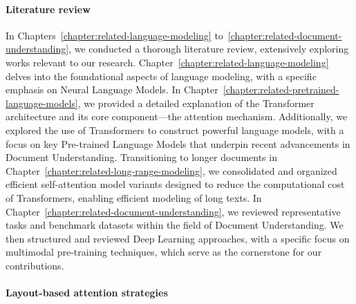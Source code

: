 

\paragraph{Literature review}

In Chapters~\ref{chapter:related-language-modeling} to~\ref{chapter:related-document-understanding}, we conducted a thorough literature review, extensively exploring works relevant to our research. Chapter~\ref{chapter:related-language-modeling} delves into the foundational aspects of language modeling, with a specific emphasis on Neural Language Models. In Chapter~\ref{chapter:related-pretrained-language-models}, we provided a detailed explanation of the Transformer architecture and its core component—the attention mechanism. Additionally, we explored the use of Transformers to construct powerful language models, with a focus on key Pre-trained Language Models that underpin recent advancements in Document Understanding. Transitioning to longer documents in Chapter~\ref{chapter:related-long-range-modeling}, we consolidated and organized efficient self-attention model variants designed to reduce the computational cost of Transformers, enabling efficient modeling of long texts. In Chapter~\ref{chapter:related-document-understanding}, we reviewed representative tasks and benchmark datasets within the field of Document Understanding. We then structured and reviewed Deep Learning approaches, with a specific focus on multimodal pre-training techniques, which serve as the cornerstone for our contributions.


\paragraph{Layout-based attention strategies}

